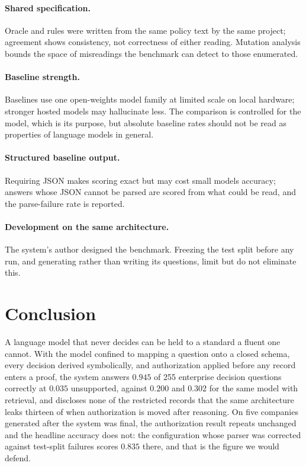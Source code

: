 \documentclass[11pt]{article}
\begin{document}
\paragraph{Shared specification.} Oracle and rules were written from the same policy text
by the same project; agreement shows consistency, not correctness of either reading.
Mutation analysis bounds the space of misreadings the benchmark can detect to those
enumerated.
\paragraph{Baseline strength.} Baselines use one open-weights model family at limited scale on
local hardware; stronger hosted models may hallucinate less. The comparison is controlled
for the model, which is its purpose, but absolute baseline rates should not be read as
properties of language models in general.
\paragraph{Structured baseline output.} Requiring JSON makes scoring exact but may cost small
models accuracy; answers whose JSON cannot be parsed are scored from what could be read, and
the parse-failure rate is reported.
\paragraph{Development on the same architecture.} The system's author designed the benchmark.
Freezing the test split before any run, and generating rather than writing its questions,
limit but do not eliminate this.

\section{Conclusion}
A language model that never decides can be held to a standard a fluent one cannot. With
the model confined to mapping a question onto a closed schema, every decision derived
symbolically, and authorization applied before any record enters a proof, the system
answers $0.945$ of 255 enterprise decision questions correctly at $0.035$ unsupported,
against $0.200$ and $0.302$ for the same model with retrieval, and discloses none of the
restricted records that the same architecture leaks thirteen of when authorization is
moved after reasoning. On five companies generated after the system was final, the
authorization result repeats unchanged and the headline accuracy does not: the
configuration whose parser was corrected against test-split failures scores $0.835$ there,
and that is the figure we would defend.
\end{document}
